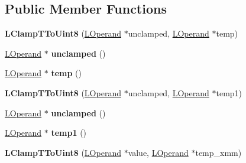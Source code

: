 \subsection*{Public Member Functions}
\begin{DoxyCompactItemize}
\item 
{\bfseries L\+Clamp\+T\+To\+Uint8} (\hyperlink{classv8_1_1internal_1_1_l_operand}{L\+Operand} $\ast$unclamped, \hyperlink{classv8_1_1internal_1_1_l_operand}{L\+Operand} $\ast$temp)\hypertarget{classv8_1_1internal_1_1_l_clamp_t_to_uint8_aeb5f160166bc8aada5329f7d44ae258a}{}\label{classv8_1_1internal_1_1_l_clamp_t_to_uint8_aeb5f160166bc8aada5329f7d44ae258a}

\item 
\hyperlink{classv8_1_1internal_1_1_l_operand}{L\+Operand} $\ast$ {\bfseries unclamped} ()\hypertarget{classv8_1_1internal_1_1_l_clamp_t_to_uint8_a8f506cfbca393e40525008142e17c30d}{}\label{classv8_1_1internal_1_1_l_clamp_t_to_uint8_a8f506cfbca393e40525008142e17c30d}

\item 
\hyperlink{classv8_1_1internal_1_1_l_operand}{L\+Operand} $\ast$ {\bfseries temp} ()\hypertarget{classv8_1_1internal_1_1_l_clamp_t_to_uint8_a7b32c7bd3e6fc617a9424e3aa38b25cc}{}\label{classv8_1_1internal_1_1_l_clamp_t_to_uint8_a7b32c7bd3e6fc617a9424e3aa38b25cc}

\item 
{\bfseries L\+Clamp\+T\+To\+Uint8} (\hyperlink{classv8_1_1internal_1_1_l_operand}{L\+Operand} $\ast$unclamped, \hyperlink{classv8_1_1internal_1_1_l_operand}{L\+Operand} $\ast$temp1)\hypertarget{classv8_1_1internal_1_1_l_clamp_t_to_uint8_abea7f6a20952c1f3ae1f0945822cd036}{}\label{classv8_1_1internal_1_1_l_clamp_t_to_uint8_abea7f6a20952c1f3ae1f0945822cd036}

\item 
\hyperlink{classv8_1_1internal_1_1_l_operand}{L\+Operand} $\ast$ {\bfseries unclamped} ()\hypertarget{classv8_1_1internal_1_1_l_clamp_t_to_uint8_a8f506cfbca393e40525008142e17c30d}{}\label{classv8_1_1internal_1_1_l_clamp_t_to_uint8_a8f506cfbca393e40525008142e17c30d}

\item 
\hyperlink{classv8_1_1internal_1_1_l_operand}{L\+Operand} $\ast$ {\bfseries temp1} ()\hypertarget{classv8_1_1internal_1_1_l_clamp_t_to_uint8_a5bd2d6ca92069a8c1b19c7e9b410617c}{}\label{classv8_1_1internal_1_1_l_clamp_t_to_uint8_a5bd2d6ca92069a8c1b19c7e9b410617c}

\item 
{\bfseries L\+Clamp\+T\+To\+Uint8} (\hyperlink{classv8_1_1internal_1_1_l_operand}{L\+Operand} $\ast$value, \hyperlink{classv8_1_1internal_1_1_l_operand}{L\+Operand} $\ast$temp\+\_\+xmm)\hypertarget{classv8_1_1internal_1_1_l_clamp_t_to_uint8_a9706efe4329562ed26faab7e7c5f8244}{}\label{classv8_1_1internal_1_1_l_clamp_t_to_uint8_a9706efe4329562ed26faab7e7c5f8244}


\end{DoxyCompactItemize}
